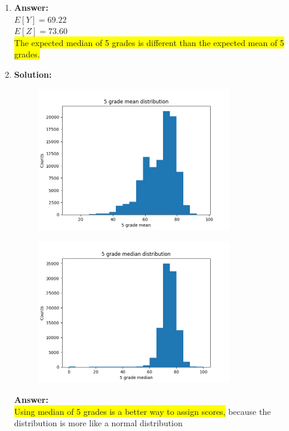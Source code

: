 \documentclass{article}
\newcommand{\myansw}{\textbf{Answer:}\\}
\newcommand{\mysolu}{\textbf{Solution:}\\}
\begin{document}
\begin{enumerate}
\begin{enumerate}
\begin{verbatim}
		
		\end{verbatim}
		
		\myansw
		$E[Z] = 73.60$\\
		\colorbox{yellow}{$S^2=56.04$}\\
		\item
		\myansw
		$E[Y] = 69.22$\\
		$E[Z] = 73.60$\\
		\colorbox{yellow}{The expected median of 5 grades is different than the expected mean of 5 grades.}\\
		\item
		\mysolu
		\begin{figure}[H]
			\centering
			\includegraphics[width=0.8\textwidth]{pset_5_13_e_1.png}
		\end{figure}
		\begin{figure}[H]
			\centering
			\includegraphics[width=0.8\textwidth]{pset_5_13_e_2.png}
		\end{figure}
		\myansw
		\colorbox{yellow}{Using median of 5 grades is a better way to assign scores,} because the distribution is more like a normal distribution
		

\end{enumerate}
\end{enumerate}
\end{document}
